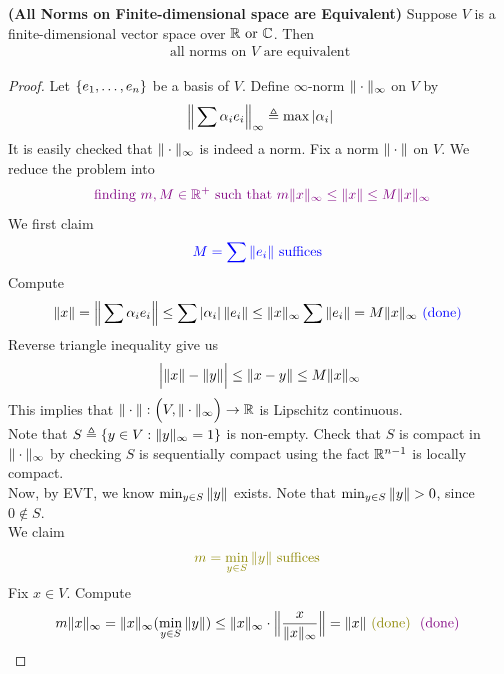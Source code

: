 \documentclass{report}
\begin{document}
\begin{theorem}
\label{ANoF}
\textbf{(All Norms on Finite-dimensional space are Equivalent)} Suppose $V$ is a finite-dimensional vector space over $\mathbb{R}\text{ or }\mathbb{C}$. Then 
\begin{align*}
\text{ all norms on $V$ are equivalent }
\end{align*}
\end{theorem}
\begin{proof}
Let $\{ e_1,\dots ,e_n \}$ be a basis of $V$. Define $\infty$-norm $\| \cdot \|_\infty$ on $V$ by 
\begin{align*}
\Big\| \sum \alpha_i e_i \Big\|_{\infty}\triangleq  \max \left|\alpha_i\right| 
\end{align*}
It is easily checked that $\| \cdot \|_\infty$ is indeed a norm. Fix a norm $\| \cdot \|$ on $V$. We reduce the problem into  
\begin{align*}
  \textcolor{violet}{\text{ finding $m,M\in\mathbb{R}^+$ such that }m\| x \|_\infty \leq \| x \|\leq M\| x \|_\infty}
\end{align*}
We first claim 
\begin{align*}
\textcolor{blue}{M=\sum \| e_i \|\text{ suffices }}
\end{align*}
Compute 
\begin{align*}
\| x \|= \Big\| \sum \alpha_ie_i \Big\| \leq \sum \left|\alpha _i\right| \| e_i \| \leq \| x \|_\infty \sum \| e_i \|= M \| x \|_\infty \textcolor{blue}{\text{ (done) }}
\end{align*}
Reverse triangle inequality give us 
\begin{align*}
\Big|\| x \|-\| y \|\Big|\leq \| x-y \| \leq M \| x \|_\infty
\end{align*}
This implies that $\| \cdot \|:\Big(V,\| \cdot \|_\infty \Big)\rightarrow \mathbb{R}$ is Lipschitz continuous.\\


 
Note that $S\triangleq \{ y \in V: \| y \|_\infty =1 \}$ is non-empty. Check that $S$ is compact in $\| \cdot \|_\infty$ by checking  $S$ is sequentially compact using the fact $\mathbb{R}^{n-1}$ is locally compact.\\


Now, by EVT, we know $\min _{y \in S}\| y \|$ exists. Note that $\min_{y \in S}\norm{y}>0$, since $0 \not\in S$.\\ 

We claim 
\begin{align*}
  \olive{m= \min_{y \in S}\norm{y}\text{ suffices }}
\end{align*}
Fix $x \in V$. Compute 
\begin{align*}
m\norm{x}_\infty = \norm{x}_\infty (\min_{y \in S} \norm{y})\leq \norm{x}_\infty \cdot  \bnorm{ \frac{x}{\norm{x}_\infty}}=\norm{x}\odone \vdone
\end{align*}






\end{proof}
\end{document}
